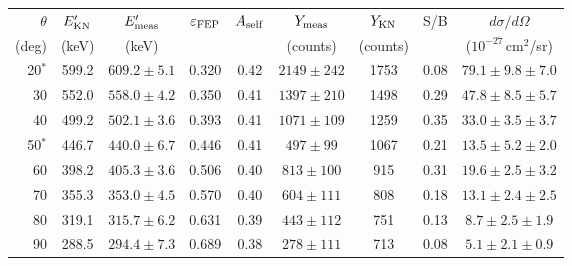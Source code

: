 \begin{tabular}{rcccccccc}
\hline\hline
$\theta$ & $E'_{\rm KN}$ & $E'_{\rm meas}$ & $\varepsilon_{\rm FEP}$ & $A_{\rm self}$ & $Y_{\rm meas}$ & $Y_{\rm KN}$ & S/B & $d\sigma/d\Omega$ \\
(deg) & (keV) & (keV) & & & (counts) & (counts) & & ($10^{-27}$\,cm$^2$/sr)\\
\hline
20$^{*}$ & 599.2 & $609.2\pm5.1$ & 0.320 & 0.42 & $2149\pm242$ & 1753 & 0.08 & $79.1\pm9.8\pm7.0$\\
30 & 552.0 & $558.0\pm4.2$ & 0.350 & 0.41 & $1397\pm210$ & 1498 & 0.29 & $47.8\pm8.5\pm5.7$\\
40 & 499.2 & $502.1\pm3.6$ & 0.393 & 0.41 & $1071\pm109$ & 1259 & 0.35 & $33.0\pm3.5\pm3.7$\\
50$^{*}$ & 446.7 & $440.0\pm6.7$ & 0.446 & 0.41 & $497\pm99$ & 1067 & 0.21 & $13.5\pm5.2\pm2.0$\\
60 & 398.2 & $405.3\pm3.6$ & 0.506 & 0.40 & $813\pm100$ & 915 & 0.31 & $19.6\pm2.5\pm3.2$\\
70 & 355.3 & $353.0\pm4.5$ & 0.570 & 0.40 & $604\pm111$ & 808 & 0.18 & $13.1\pm2.4\pm2.5$\\
80 & 319.1 & $315.7\pm6.2$ & 0.631 & 0.39 & $443\pm112$ & 751 & 0.13 & $8.7\pm2.5\pm1.9$\\
90 & 288.5 & $294.4\pm7.3$ & 0.689 & 0.38 & $278\pm111$ & 713 & 0.08 & $5.1\pm2.1\pm0.9$\\
\hline\hline
\end{tabular}
